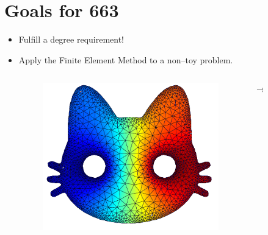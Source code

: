 \documentclass[9pt]{beamer}
\begin{document}
\section{Goals for 663}
\begin{frame}
	\begin{itemize}
		\item Fulfill a degree requirement!
		
		\item Apply the Finite Element Method to a non--toy problem.
			\begin{columns}
			\begin{column}{.25\textwidth}
				\raggedleft
				\begin{figure}
					\includegraphics[scale=0.225]{cat.png}
				\end{figure}
			\end{column}
			\begin{column}{.1\textwidth}
				\centering
				$\large\rightarrow$
			\end{column}
			\begin{column}{.4\textwidth}
				\begin{figure}
					\raggedright
				\end{figure}
			\end{column}
		\end{columns}
	

\end{itemize}
\end{frame}
\end{document}
